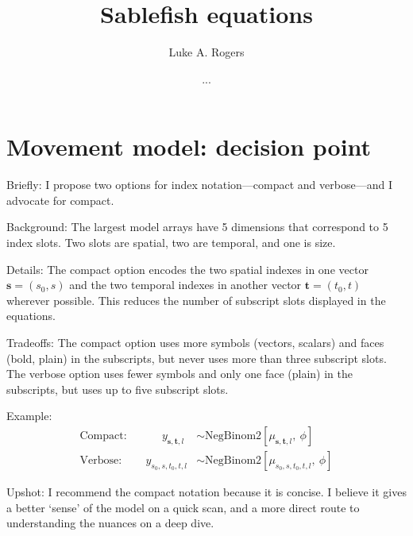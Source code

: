 \documentclass{article}
\title{Sablefish equations }
\author[1]{Luke A. Rogers}
\author[]{...}
\affil[1]{Pacific Biological Station, Fisheries and Oceans Canada, Nanaimo, BC, V9T 6N7, Canada}
\begin{document}
\maketitle
\linenumbers
\setcounter{secnumdepth}{0}

\section{Movement model: decision point}

Briefly: I propose two options for index notation---compact and verbose---and I advocate for compact.
\newline

\noindent Background: The largest model arrays have 5 dimensions that correspond to 5 index slots. Two slots are spatial, two are temporal, and one is size.
\newline

\noindent Details: The compact option encodes the two spatial indexes in one vector $\boldsymbol{s} = \left( s_0,s \right)$ and the two temporal indexes in another vector $\boldsymbol{t} = \left( t_0, t \right)$ wherever possible. This reduces the number of subscript slots displayed in the equations.
\newline

\noindent Tradeoffs: The compact option uses more symbols (vectors, scalars) and faces (bold, plain) in the subscripts, but never uses more than three subscript slots. The verbose option uses fewer symbols and only one face (plain) in the subscripts, but uses up to five subscript slots.
\newline

\noindent Example:
\begin{align}
  \mathrm{Compact:}\qquad \quad y_{\boldsymbol{s}, \boldsymbol{t},l} &\sim \mathrm{NegBinom2} \!
                                                                 \left[\mu_{\boldsymbol{s}, \boldsymbol{t},l}
                                                                 \mathrm{,} \: \phi \right] \\
  \mathrm{Verbose:}\qquad y_{s_0,s,t_0,t,l} &\sim \mathrm{NegBinom2} \!
                                              \left[\mu_{s_0,s,t_0,t,l} \mathrm{,} \: \phi \right]
\end{align}

\noindent Upshot: I recommend the compact notation because it is concise. I believe it gives a better `sense' of the model on a quick scan, and a more direct route to understanding the nuances on a deep dive.
\end{document}
